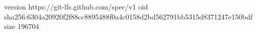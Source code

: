 version https://git-lfs.github.com/spec/v1
oid sha256:6304a20920f2f88cc8895488f0a4c0158d2bd562791bb5315d8371247e150bdf
size 196704

